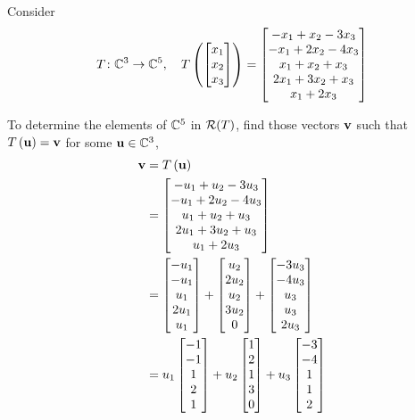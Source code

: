 \documentclass{ximera}
\begin{document}
\begin{example}
Consider
\[
T\colon \mathbb{C}^{3}\rightarrow\mathbb{C}^{5},\quad
T\left(\begin{bmatrix}x_1\\x_2\\x_3\end{bmatrix}\right)=
\begin{bmatrix}-x_1 + x_2 - 3 x_3\\
-x_1 + 2 x_2 - 4 x_3\\
x_1 + x_2 + x_3\\
2 x_1 + 3 x_2 + x_3\\
x_1 + 2 x_3
\end{bmatrix}
\]


To determine the elements of $\mathbb{C}^{5}$ in $\mathcal{R}\!\left(T\right)$, find those vectors $\mathbf{v}$ such that $T\left(\mathbf{u}\right)=\mathbf{v}$ for some $\mathbf{u}\in\mathbb{C}^{3}$,
\begin{align*}
\mathbf{v}&=T\left(\mathbf{u}\right)\\
&=\begin{bmatrix}-u_1 + u_2 - 3 u_3\\
-u_1 + 2 u_2 - 4 u_3\\
u_1 + u_2 + u_3\\
2 u_1 + 3 u_2 + u_3\\
u_1 + 2 u_3
\end{bmatrix}\\
&=
\begin{bmatrix}-u_1\\-u_1\\u_1\\2 u_1\\ u_1\end{bmatrix}
+
\begin{bmatrix}u_2\\2u_2\\u_2\\3u_2\\ 0\end{bmatrix}
+
\begin{bmatrix}-3u_3\\-4u_3\\u_3\\u_3\\ 2 u_3\end{bmatrix}\\
&=
u_1\begin{bmatrix}-1\\-1\\1\\2\\1\end{bmatrix}
+
u_2\begin{bmatrix}1\\2\\1\\3\\ 0\end{bmatrix}
+
u_3\begin{bmatrix}-3\\-4\\1\\1\\2\end{bmatrix}
\end{align*}





\end{example}
\end{document}
